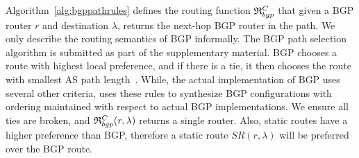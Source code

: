  \iffull
Algorithm~\ref{alg:bgppathrules} defines the routing function 
$\mathfrak{R}_{bgp}^C$ 
that given 
a BGP router $r$
and destination  
$\lambda$,
returns 
the next-hop BGP router in the path. 
\else
We only describe the routing semantics of BGP
informally. The BGP path selection algorithm is submitted as part of the supplementary material.
\fi
BGP 
chooses a route with highest local preference, and
if there is a tie, it then chooses the route with smallest
AS path length~\cite{bgp}. While, the actual implementation
of BGP uses several other criteria,
\name uses these rules to synthesize BGP configurations with 
ordering maintained with respect to actual BGP implementations.
We ensure all ties are broken, and $\mathfrak{R}_{bgp}^C(r,\lambda)$
returns a single router. Also, static routes 
have a higher preference than BGP, therefore a static route
$SR(r, \lambda)$ will be preferred over the BGP route.

